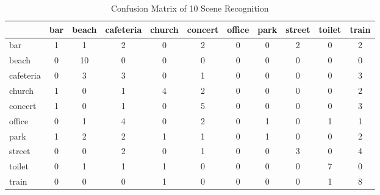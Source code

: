 \begin{table*}[th]
\centering
\small
\caption{Confusion Matrix of 10 Scene Recognition}
\label{tab:conf}
\begin{tabular}{lcccccccccc}
\hline
 & bar&beach & cafeteria & church & concert & office & park & street & toilet & train\\\hline
bar & 1 & 1 & 2 & 0 & 2 & 0 & 0 & 2 & 0 & 2 \\ \hline
beach & 0 & 10 & 0 & 0 & 0 & 0 & 0 & 0 & 0 & 0 \\ \hline
cafeteria & 0 & 3 & 3 & 0 & 1 & 0 & 0 & 0 & 0 & 3 \\ \hline
church & 1 & 0 & 1 & 4 & 2 & 0 & 0 & 0 & 0 & 2 \\ \hline
concert & 1 & 0 & 1 & 0 & 5 & 0 & 0 & 0 & 0 & 3 \\ \hline
office & 0 & 1 & 4 & 0 & 2 & 0 & 1 & 0 & 1 & 1 \\ \hline
park & 1 & 2 & 2 & 1 & 1 & 0 & 1 & 0 & 0 & 2 \\ \hline
street & 0 & 0 & 2 & 0 & 1 & 0 & 0 & 3 & 0 & 4 \\ \hline
toilet & 0 & 1 & 1 & 1 & 0 & 0 & 0 & 0 & 7 & 0 \\ \hline
train & 0 & 0 & 0 & 1 & 0 & 0 & 0 & 0 & 1 & 8 \\ \hline
\end{tabular}
\end{table*}


